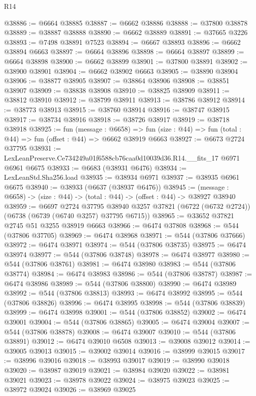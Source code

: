 \begin{lexlean}{R14}
\begin{coremodule}
@38886 := @6664 @38885
@38887 := @6662 @38886
@38888 := @37800 @38878
@38889 := @38887 @38888
@38890 := @6662 @38889
@38891 := @37665 @3226
@38893 := @7498 @38891 @7523
@38894 := @6667 @38893
@38896 := @6662 @38894 @6663
@38897 := @6664 @38896
@38898 := @6664 @38897
@38899 := @6664 @38898
@38900 := @6662 @38899
@38901 := @37800 @38891
@38902 := @38900 @38901
@38904 := @6662 @38902 @6663
@38905 := @38890 @38904
@38906 := @38877 @38905
@38907 := @38864 @38906
@38908 := @38851 @38907
@38909 := @38838 @38908
@38910 := @38825 @38909
@38911 := @38812 @38910
@38912 := @38799 @38911
@38913 := @38786 @38912
@38914 := @38773 @38913
@38915 := @38760 @38914
@38916 := @38747 @38915
@38917 := @38734 @38916
@38918 := @38726 @38917
@38919 := @38718 @38918
@38925 := fun (message : @6658) =>
  fun (size : @44) => fun (total : @44) => fun (offset : @44) => @6662 @38919 @6663
@38927 := @6673 @2724 @37795
@38931 := LexLeanPreserve.Ce734249a01f6588cb76caa0d10039d36.R14.__fits_17 @6971 @6961 @6675
@38933 := @6683 (@38931 @6476)
@38934 := LexLeanStd.Sha256.load
@38935 := @38934 @6971
@38937 := @38935 @6961 @6675
@38940 := @38933 (@6637 (@38937 @6476))
@38945 := (message : @6658) -> (size : @44) -> (total : @44) -> (offset : @44) -> @38927 @38940
@38959 := @6697
    @2724
    @37795
    @38940
    @3257
    @37821
    (@6722 (@6732 @2724))
    (@6738 (@6739 (@6740 @3257) @37795 @6715))
@38965 := @33652 @37821 @2745 @51 @3255 @38919 @6663
@38966 := @6474 @37808
@38968 := @544 (@37806 @37705)
@38969 := @6474 @38968
@38971 := @544 (@37806 @37666)
@38972 := @6474 @38971
@38974 := @544 (@37806 @38735)
@38975 := @6474 @38974
@38977 := @544 (@37806 @38748)
@38978 := @6474 @38977
@38980 := @544 (@37806 @38761)
@38981 := @6474 @38980
@38983 := @544 (@37806 @38774)
@38984 := @6474 @38983
@38986 := @544 (@37806 @38787)
@38987 := @6474 @38986
@38989 := @544 (@37806 @38800)
@38990 := @6474 @38989
@38992 := @544 (@37806 @38813)
@38993 := @6474 @38992
@38995 := @544 (@37806 @38826)
@38996 := @6474 @38995
@38998 := @544 (@37806 @38839)
@38999 := @6474 @38998
@39001 := @544 (@37806 @38852)
@39002 := @6474 @39001
@39004 := @544 (@37806 @38865)
@39005 := @6474 @39004
@39007 := @544 (@37806 @38878)
@39008 := @6474 @39007
@39010 := @544 (@37806 @38891)
@39012 := @6474 @39010 @6508
@39013 := @39008 @39012
@39014 := @39005 @39013
@39015 := @39002 @39014
@39016 := @38999 @39015
@39017 := @38996 @39016
@39018 := @38993 @39017
@39019 := @38990 @39018
@39020 := @38987 @39019
@39021 := @38984 @39020
@39022 := @38981 @39021
@39023 := @38978 @39022
@39024 := @38975 @39023
@39025 := @38972 @39024
@39026 := @38969 @39025

\end{coremodule}
\end{lexlean}
